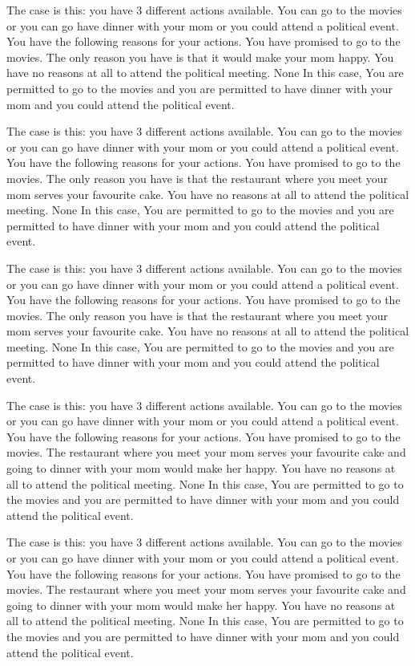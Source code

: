 The case is this: you have  3  different actions available.  You can go to the movies or you can go have dinner with your mom or you could attend a political event.
You have the following reasons for your actions.  You have promised to go to the movies. The only reason you have is that it would make your mom happy. You have no reasons at all to attend the political meeting. 
None
In this case,  You are permitted to go to the movies and you are permitted to have dinner with your mom and you could attend the political event.
 
The case is this: you have  3  different actions available.  You can go to the movies or you can go have dinner with your mom or you could attend a political event.
You have the following reasons for your actions.  You have promised to go to the movies. The only reason you have is that the restaurant where you meet your mom serves your favourite cake. You have no reasons at all to attend the political meeting. 
None
In this case,  You are permitted to go to the movies and you are permitted to have dinner with your mom and you could attend the political event.
 
The case is this: you have  3  different actions available.  You can go to the movies or you can go have dinner with your mom or you could attend a political event.
You have the following reasons for your actions.  You have promised to go to the movies. The only reason you have is that the restaurant where you meet your mom serves your favourite cake. You have no reasons at all to attend the political meeting. 
None
In this case,  You are permitted to go to the movies and you are permitted to have dinner with your mom and you could attend the political event.
 
The case is this: you have  3  different actions available.  You can go to the movies or you can go have dinner with your mom or you could attend a political event.
You have the following reasons for your actions.  You have promised to go to the movies. The restaurant where you meet your mom serves your favourite cake and going to dinner with your mom would make her happy. You have no reasons at all to attend the political meeting. 
None
In this case,  You are permitted to go to the movies and you are permitted to have dinner with your mom and you could attend the political event.
 
The case is this: you have  3  different actions available.  You can go to the movies or you can go have dinner with your mom or you could attend a political event.
You have the following reasons for your actions.  You have promised to go to the movies. The restaurant where you meet your mom serves your favourite cake and going to dinner with your mom would make her happy. You have no reasons at all to attend the political meeting. 
None
In this case,  You are permitted to go to the movies and you are permitted to have dinner with your mom and you could attend the political event.
 
